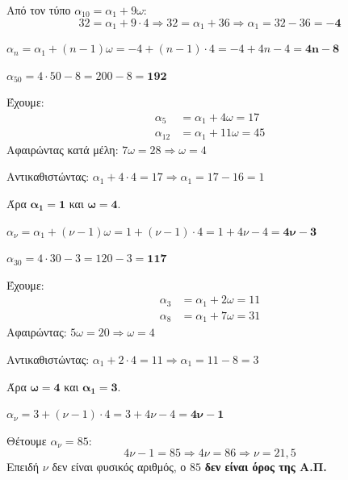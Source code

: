 \documentclass[11pt,a4paper,modern]{FFExercises}
\begin{document}
\lysh[6]
\begin{alist}
\item Από τον τύπο $\alpha_{10}=\alpha_1+9\omega$:
$$32=\alpha_1+9\cdot 4 \Rightarrow 32=\alpha_1+36 \Rightarrow \alpha_1=32-36=\boldsymbol{-4}$$

\item $\alpha_n=\alpha_1+(n-1)\omega=-4+(n-1)\cdot 4=-4+4n-4=\boldsymbol{4n-8}$

\item $\alpha_{50}=4\cdot 50-8=200-8=\boldsymbol{192}$
\end{alist}

\lysh[7]
\begin{alist}
\item Έχουμε:
\begin{align*}
\alpha_5&=\alpha_1+4\omega=17\\
\alpha_{12}&=\alpha_1+11\omega=45
\end{align*}
Αφαιρώντας κατά μέλη: $7\omega=28 \Rightarrow \omega=4$

Αντικαθιστώντας: $\alpha_1+4\cdot 4=17 \Rightarrow \alpha_1=17-16=1$

Άρα $\boldsymbol{\alpha_1=1}$ και $\boldsymbol{\omega=4}$.

\item $\alpha_{\nu}=\alpha_1+(\nu-1)\omega=1+(\nu-1)\cdot 4=1+4\nu-4=\boldsymbol{4\nu-3}$

\item $\alpha_{30}=4\cdot 30-3=120-3=\boldsymbol{117}$
\end{alist}

\lysh[8]
\begin{alist}
\item Έχουμε:
\begin{align*}
\alpha_3&=\alpha_1+2\omega=11\\
\alpha_8&=\alpha_1+7\omega=31
\end{align*}
Αφαιρώντας: $5\omega=20 \Rightarrow \omega=4$

Αντικαθιστώντας: $\alpha_1+2\cdot 4=11 \Rightarrow \alpha_1=11-8=3$

Άρα $\boldsymbol{\omega=4}$ και $\boldsymbol{\alpha_1=3}$.

\item $\alpha_{\nu}=3+(\nu-1)\cdot 4=3+4\nu-4=\boldsymbol{4\nu-1}$

\item Θέτουμε $\alpha_{\nu}=85$:
$$4\nu-1=85 \Rightarrow 4\nu=86 \Rightarrow \nu=21{,}5$$
Επειδή $\nu$ δεν είναι φυσικός αριθμός, ο $85$ \textbf{δεν είναι όρος της Α.Π.}
\end{alist}
\end{document}
